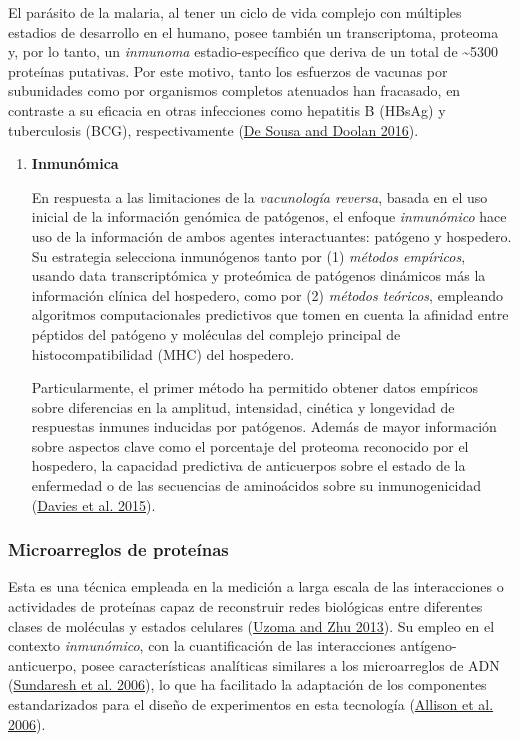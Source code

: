 \documentclass[
  a4paper]{article}
\begin{document}
\begin{enumerate}
  El parásito de la malaria, al tener un ciclo de vida complejo con
  múltiples estadios de desarrollo en el humano, posee también un
  transcriptoma, proteoma y, por lo tanto, un \emph{inmunoma}
  estadio-específico que deriva de un total de \textasciitilde5300
  proteínas putativas. Por este motivo, tanto los esfuerzos de vacunas
  por subunidades como por organismos completos atenuados han fracasado,
  en contraste a su eficacia en otras infecciones como hepatitis B
  (HBsAg) y tuberculosis (BCG), respectivamente
  (\protect\hyperlink{ref-immunomics2016}{De Sousa and Doolan 2016}).

  \begin{enumerate}
  \def\labelenumii{\roman{enumii}.}
  \item
    \textbf{Inmunómica}

    En respuesta a las limitaciones de la \emph{vacunología reversa},
    basada en el uso inicial de la información genómica de patógenos, el
    enfoque \emph{inmunómico} hace uso de la información de ambos
    agentes interactuantes: patógeno y hospedero. Su estrategia
    selecciona inmunógenos tanto por (1) \emph{métodos empíricos},
    usando data transcriptómica y proteómica de patógenos dinámicos más
    la información clínica del hospedero, como por (2) \emph{métodos
    teóricos}, empleando algoritmos computacionales predictivos que
    tomen en cuenta la afinidad entre péptidos del patógeno y moléculas
    del complejo principal de histocompatibilidad (MHC) del hospedero.

    Particularmente, el primer método ha permitido obtener datos
    empíricos sobre diferencias en la amplitud, intensidad, cinética y
    longevidad de respuestas inmunes inducidas por patógenos. Además de
    mayor información sobre aspectos clave como el porcentaje del
    proteoma reconocido por el hospedero, la capacidad predictiva de
    anticuerpos sobre el estado de la enfermedad o de las secuencias de
    aminoácidos sobre su inmunogenicidad
    (\protect\hyperlink{ref-Davies2015Large}{Davies et al. 2015}).
  \end{enumerate}
\end{enumerate}

\hypertarget{microarreglos-de-proteuxednas}{%
\subsubsection{Microarreglos de
proteínas}\label{microarreglos-de-proteuxednas}}

Esta es una técnica empleada en la medición a larga escala de las
interacciones o actividades de proteínas capaz de reconstruir redes
biológicas entre diferentes clases de moléculas y estados celulares
(\protect\hyperlink{ref-uzoma2013interactome}{Uzoma and Zhu 2013}). Su
empleo en el contexto \emph{inmunómico}, con la cuantificación de las
interacciones antígeno-anticuerpo, posee características analíticas
similares a los microarreglos de ADN
(\protect\hyperlink{ref-sundaresh2006}{Sundaresh et al. 2006}), lo que
ha facilitado la adaptación de los componentes estandarizados para el
diseño de experimentos en esta tecnología
(\protect\hyperlink{ref-allison2006}{Allison et al. 2006}).
\end{document}

